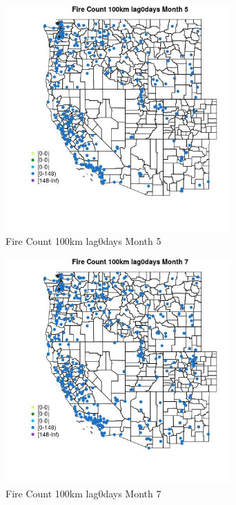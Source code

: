 \begin{figure} 
\centering  
\includegraphics[width=0.77\textwidth]{Code_Outputs/Report_ML_input_PM25_Step4_part_e_de_duplicated_aves_compiled_2019-05-18wNAs_MapObsMo5Fire_Count_100km_lag0days.jpg} 
\caption{\label{fig:Report_ML_input_PM25_Step4_part_e_de_duplicated_aves_compiled_2019-05-18wNAsMapObsMo5Fire_Count_100km_lag0days}Fire Count 100km lag0days Month 5} 
\end{figure} 
 

\clearpage 

\begin{figure} 
\centering  
\includegraphics[width=0.77\textwidth]{Code_Outputs/Report_ML_input_PM25_Step4_part_e_de_duplicated_aves_compiled_2019-05-18wNAs_MapObsMo7Fire_Count_100km_lag0days.jpg} 
\caption{\label{fig:Report_ML_input_PM25_Step4_part_e_de_duplicated_aves_compiled_2019-05-18wNAsMapObsMo7Fire_Count_100km_lag0days}Fire Count 100km lag0days Month 7} 
\end{figure} 
 

